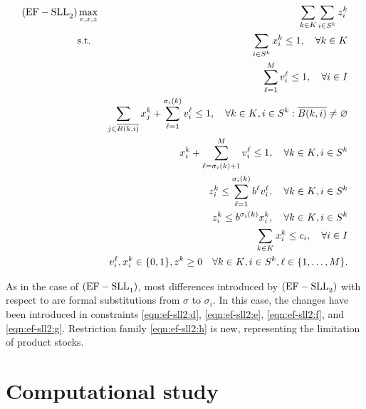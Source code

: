 {
    \newcommand{\bover}   {\overline{B(k, i)}}
    \newcommand{\bne}     {\bover\neq\varnothing}
    \newcommand{\sumk}    {\sum_{\kk}}
    \newcommand{\sumi}    {\sum_{\is}}
    \newcommand{\sumlm}   {\sum_{\ell=1}^{M}}
    \newcommand{\sumj}    {\sum_{j\in\bover}}
    \newcommand{\sumls}   {\sum_{\ell=1}^{\sigma_i(k)}}
    \newcommand{\sumlsm}  {\sum_{\ell=\sigma_i(k)+1}^{M}}
    
    \begin{eqnarray}
        \rm{(EF-SLL}_2\rm{)}
        &\max_{v, x, z}
            & \sumk\sumi z^k_i                                         \label{eqn:ef-sll2:a}\\
        &\text{s.t.}
            & \sumi  x_i^k                  \leq 1, \quad\forall\kk    \label{eqn:ef-sll2:b}\\
        &   & \sumlm v_i^\ell               \leq 1, \quad\forall\ii    \label{eqn:ef-sll2:c}\\
        &   & \sumj x_j^k + \sumls v_i^\ell \leq 1, \quad\forall\kk,\is:\bne
                                                                       \label{eqn:ef-sll2:d}\\
        &   & x_i^k + \sumlsm v_i^\ell      \leq 1, \quad\forall\kk,\is\label{eqn:ef-sll2:e}\\
        &   & z^k_i \leq \sumls b^\ell v_i^\ell,    \quad\forall\kk,\is\label{eqn:ef-sll2:f}\\
        &   & z^k_i \leq b^{\sigma_i(k)} x_i^k,     \quad\forall\kk,\is\label{eqn:ef-sll2:g}\\
        &   & \sumk  x_i^k \leq c_i,                \quad\forall\ii    \label{eqn:ef-sll2:h}\\
        &   & v_i^\ell, x_i^k \in \binset, z^k\geq 0\quad\forall\kk,\is,\lm.
                                                                       \label{eqn:ef-sll2:i}
    \end{eqnarray}
}

As in the case of $\rm{(EF-SLL}_1\rm{)}$, most differences introduced by
$\rm{(EF-SLL}_2\rm{)}$ with respect to \sllb are formal substitutions from
$\sigma$ to $\sigma_i$. In this case, the changes have been introduced in
constraints \eqref{eqn:ef-sll2:d}, \eqref{eqn:ef-sll2:e}, \eqref{eqn:ef-sll2:f},
and \eqref{eqn:ef-sll2:g}. Restriction family \eqref{eqn:ef-sll2:h} is new,
representing the limitation of product stocks.

\section{Computational study} %
\label{sec:cwe:computational-sutudy}


